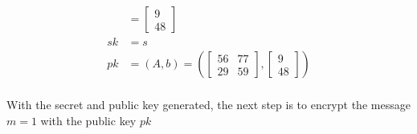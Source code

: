 \begin{align*}
     & = \begin{bmatrix}
           9 \\ 
           48 
         \end{bmatrix}                      \\
  sk & = s                                   \\
  pk & = (A, b) = \left (
  \begin{bmatrix}
      56 & 77  \\
      29 & 59 
    \end{bmatrix},
  \begin{bmatrix}
      9 \\
      48 
    \end{bmatrix} \right )                     \\
\end{align*}

With the secret and public key generated, the next step is to encrypt the message $m=1$ with the public key $pk$

